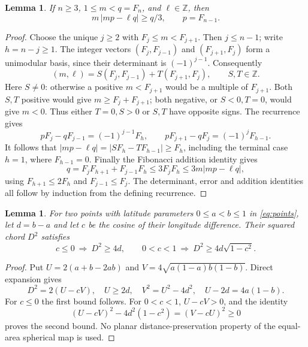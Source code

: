 \documentclass[11pt]{article}
\newtheorem{lemma}[theorem]{Lemma}
\newcommand{\Z}{\mathbb Z}
\begin{document}
\begin{lemma}\label{lem:arithmetic}
If $n\geq3$, $1\leq m<q=F_n$, and $\ell\in\Z$, then
\[
 m\,|mp-\ell q|\geq q/3,\qquad p=F_{n-1}.
\]
\end{lemma}
\begin{proof}
Choose the unique $j\geq2$ with $F_j\leq m<F_{j+1}$.
Then $j\leq n-1$; write $h=n-j\geq1$.
The integer vectors $(F_j,F_{j-1})$ and $(F_{j+1},F_j)$ form a
unimodular basis, since their determinant is $(-1)^{j-1}$.
Consequently
\[
 (m,\ell)=S(F_j,F_{j-1})+T(F_{j+1},F_j),\qquad S,T\in\Z.
\]
Here $S\ne0$: otherwise a positive $m<F_{j+1}$ would be a multiple
of $F_{j+1}$. Both $S,T$ positive would give $m\geq F_j+F_{j+1}$;
both negative, or $S<0,T=0$, would give $m<0$. Thus either $T=0,S>0$
or $S,T$ have opposite signs. The recurrence gives
\[
 pF_j-qF_{j-1}=(-1)^{j-1}F_h,\qquad
 pF_{j+1}-qF_j=(-1)^jF_{h-1}.
\]
It follows that $|mp-\ell q|=|SF_h-TF_{h-1}|\geq F_h$,
including the terminal case $h=1$, where $F_{h-1}=0$.
Finally the Fibonacci addition identity gives
\[
 q=F_jF_{h+1}+F_{j-1}F_h\leq3F_jF_h
 \leq3m|mp-\ell q|,
\]
using $F_{h+1}\leq2F_h$ and $F_{j-1}\leq F_j$.
The determinant, error and addition identities all follow by induction
from the defining recurrence.
\end{proof}

\begin{lemma}\label{lem:geometry}
For two points with latitude parameters $0\leq a<b\leq1$ in
\eqref{eq:points}, let $d=b-a$ and let $c$ be the cosine of their
longitude difference. Their squared chord $D^2$ satisfies
\[
 c\leq0\ \Longrightarrow\ D^2\geq4d,
 \qquad
 0<c<1\ \Longrightarrow\ D^2\geq4d\sqrt{1-c^2}.
\]
\end{lemma}
\begin{proof}
Put $U=2(a+b-2ab)$ and $V=4\sqrt{a(1-a)b(1-b)}$.
Direct expansion gives
\[
 D^2=2(U-cV),\quad U\geq2d,\quad V^2=U^2-4d^2,
 \quad U-2d=4a(1-b).
\]
For $c\leq0$ the first bound follows. For $0<c<1$, $U-cV>0$,
and the identity
\[
 (U-cV)^2-4d^2(1-c^2)=(V-cU)^2\geq0
\]
proves the second bound. No planar distance-preservation property of
the equal-area spherical map is used.
\end{proof}
\end{document}

